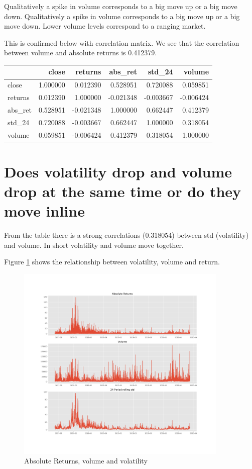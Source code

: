 Qualitatively a spike in volume corresponds to a big move up or a big move down.
Qualitatively a spike in volume corresponds to a big move up or a big move down. Lower volume levels correspond to a ranging market.

This is confirmed below with correlation matrix. We see that the correlation between volume and absolute returns is 0.412379. \\
\begin{tabular}{lrrrrr}
\toprule
{} &     close &   returns &   abs\_ret &    std\_24 &    volume \\
\midrule
close   &  1.000000 &  0.012390 &  0.528951 &  0.720088 &  0.059851 \\
returns &  0.012390 &  1.000000 & -0.021348 & -0.003667 & -0.006424 \\
abs\_ret &  0.528951 & -0.021348 &  1.000000 &  0.662447 &  0.412379 \\
std\_24  &  0.720088 & -0.003667 &  0.662447 &  1.000000 &  0.318054 \\
volume  &  0.059851 & -0.006424 &  0.412379 &  0.318054 &  1.000000 \\
\bottomrule
\end{tabular}
\section{ Does volatility drop and volume drop at the same time or do they move inline}
From the table there is a strong correlations (0.318054) between std (volatility) and volume. In short volatility and volume move together.

Figure \ref{fig:rvs} shows the relationship between volatility, volume and return.
\begin{figure}[H]
\center
\includegraphics[width=0.9\textwidth]{fig/rvs.png}
\caption{Absolute Returns, volume and volatility }
\label{fig:rvs}
\end{figure}
